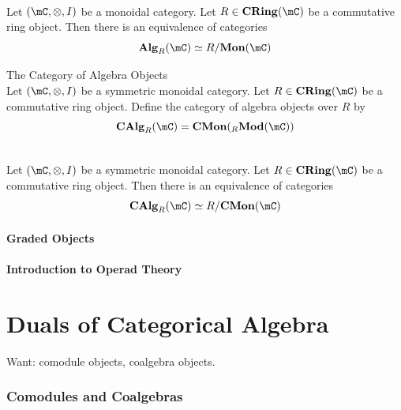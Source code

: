 \documentclass[a4paper]{article}
\begin{document}
\begin{prp}{}{}\\
Let $(\mC,\otimes,I)$ be a monoidal category. Let $R\in\bold{CRing}(\mC)$ be a commutative ring object. Then there is an equivalence of categories $$\bold{Alg}_R(\mC)\simeq R/\bold{Mon}(\mC)$$
\end{prp}

\begin{defn}{The Category of Algebra Objects}{}\\
Let $(\mC,\otimes,I)$ be a symmetric monoidal category. Let $R\in\bold{CRing}(\mC)$ be a commutative ring object. Define the category of algebra objects over $R$ by $$\bold{CAlg}_R(\mC)=\bold{CMon}({_R}\bold{Mod}(\mC))$$
\end{defn}

\begin{prp}{}{}\\
Let $(\mC,\otimes,I)$ be a symmetric monoidal category. Let $R\in\bold{CRing}(\mC)$ be a commutative ring object. Then there is an equivalence of categories $$\bold{CAlg}_R(\mC)\simeq R/\bold{CMon}(\mC)$$
\end{prp}

\subsection{Graded Objects}

\subsection{Introduction to Operad Theory}

\pagebreak
\part{Duals of Categorical Algebra}
Want: comodule objects, coalgebra objects. 

\pagebreak
\section{Comodules and Coalgebras}
\end{document}
